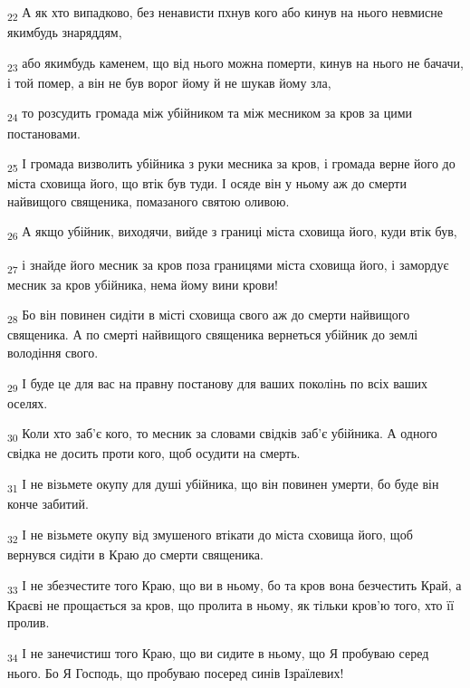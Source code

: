 \begin{tcolorbox}
\textsubscript{22} А як хто випадково, без ненависти пхнув кого або кинув на нього невмисне якимбудь знаряддям,
\end{tcolorbox}
\begin{tcolorbox}
\textsubscript{23} або якимбудь каменем, що від нього можна померти, кинув на нього не бачачи, і той помер, а він не був ворог йому й не шукав йому зла,
\end{tcolorbox}
\begin{tcolorbox}
\textsubscript{24} то розсудить громада між убійником та між месником за кров за цими постановами.
\end{tcolorbox}
\begin{tcolorbox}
\textsubscript{25} І громада визволить убійника з руки месника за кров, і громада верне його до міста сховища його, що втік був туди. І осяде він у ньому аж до смерти найвищого священика, помазаного святою оливою.
\end{tcolorbox}
\begin{tcolorbox}
\textsubscript{26} А якщо убійник, виходячи, вийде з границі міста сховища його, куди втік був,
\end{tcolorbox}
\begin{tcolorbox}
\textsubscript{27} і знайде його месник за кров поза границями міста сховища його, і замордує месник за кров убійника, нема йому вини крови!
\end{tcolorbox}
\begin{tcolorbox}
\textsubscript{28} Бо він повинен сидіти в місті сховища свого аж до смерти найвищого священика. А по смерті найвищого священика вернеться убійник до землі володіння свого.
\end{tcolorbox}
\begin{tcolorbox}
\textsubscript{29} І буде це для вас на правну постанову для ваших поколінь по всіх ваших оселях.
\end{tcolorbox}
\begin{tcolorbox}
\textsubscript{30} Коли хто заб'є кого, то месник за словами свідків заб'є убійника. А одного свідка не досить проти кого, щоб осудити на смерть.
\end{tcolorbox}
\begin{tcolorbox}
\textsubscript{31} І не візьмете окупу для душі убійника, що він повинен умерти, бо буде він конче забитий.
\end{tcolorbox}
\begin{tcolorbox}
\textsubscript{32} І не візьмете окупу від змушеного втікати до міста сховища його, щоб вернувся сидіти в Краю до смерти священика.
\end{tcolorbox}
\begin{tcolorbox}
\textsubscript{33} І не збезчестите того Краю, що ви в ньому, бо та кров вона безчестить Край, а Краєві не прощається за кров, що пролита в ньому, як тільки кров'ю того, хто її пролив.
\end{tcolorbox}
\begin{tcolorbox}
\textsubscript{34} І не занечистиш того Краю, що ви сидите в ньому, що Я пробуваю серед нього. Бо Я Господь, що пробуваю посеред синів Ізраїлевих!
\end{tcolorbox}
